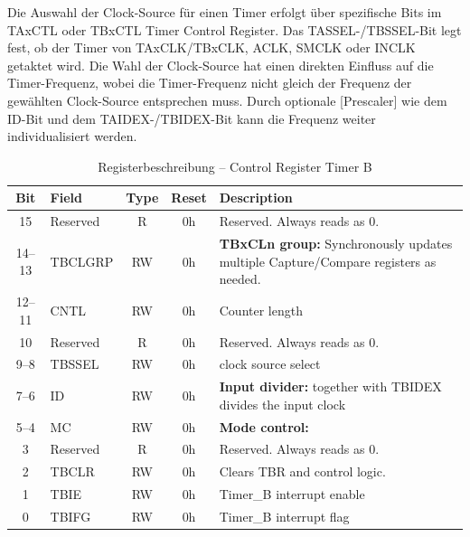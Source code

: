 Die Auswahl der Clock-Source f\"ur einen Timer erfolgt \"uber spezifische Bits im TAxCTL oder TBxCTL Timer Control Register. Das TASSEL-/TBSSEL-Bit legt fest, ob der Timer von TAxCLK/TBxCLK, ACLK, SMCLK oder INCLK getaktet wird. Die Wahl der Clock-Source hat einen direkten Einfluss auf die Timer-Frequenz, wobei die Timer-Frequenz nicht gleich der Frequenz der gew\"ahlten Clock-Source entsprechen muss. Durch optionale [Prescaler] wie dem ID-Bit und dem TAIDEX-/TBIDEX-Bit kann die Frequenz weiter individualisiert werden. 

\begin{table}[h!]
	\small
	\centering
	\begin{tabular}{|c|l|c|c|p{8cm}|}
		\hline
		\textbf{Bit} & \textbf{Field} & \textbf{Type} & \textbf{Reset} & \textbf{Description} \\ \hline
		15 & Reserved & R & 0h & Reserved. Always reads as 0. \\ \hline
		14–13 & TBCLGRP & RW & 0h & \textbf{TBxCLn group:} Synchronously updates multiple Capture/Compare registers as needed. \\ \hline
		12–11 & CNTL & RW & 0h & Counter length \\ \hline
		10 & Reserved & R & 0h & Reserved. Always reads as 0. \\ \hline
		9–8 & TBSSEL & RW & 0h & clock source select \\ \hline
		7–6 & ID & RW & 0h & \textbf{Input divider:} together with TBIDEX divides the input clock \\ \hline
		5–4 & MC & RW & 0h & \textbf{Mode control:} \Kapitel{Timer_CountMode} \\ \hline
		3 & Reserved & R & 0h & Reserved. Always reads as 0. \\ \hline
		2 & TBCLR & RW & 0h & Clears TBR and control logic. \\ \hline
		1 & TBIE & RW & 0h & Timer\_B interrupt enable \\ \hline
		0 & TBIFG & RW & 0h & Timer\_B interrupt flag \\ \hline
	\end{tabular}
	\caption{Registerbeschreibung – Control Register Timer B\\}
	\label{tab:tb_c_register}
\end{table}

